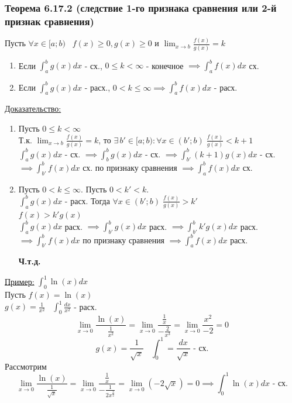 \documentclass[12pt]{article}
\begin{document}
    \subsubsection*{Теорема 6.17.2 (следствие 1-го признака сравнения или 2-й признак сравнения)}\label{th:}
    Пусть $\forall x \in [a;b) \;\;\; f(x)\geq 0,g(x)\geq 0$ и $\lim_{x \to b}\frac{f(x)}{g(x)}=k$
    \begin{enumerate}
        \item Если $\int_{a}^{b}g(x)dx$ - сх., $0\leq k< \infty$ - конечное $\implies \int_{a}^{b}f(x)dx$ сх.
        \item Если $\int_{a}^{b}g(x)dx$ - расх., $0 < k \leq \infty \implies \int_{a}^{b}f(x)dx$ - расх.
    \end{enumerate}
    \underline{Доказательство:}
    \begin{adjustwidth}{1.5em}{1.5em}
        \begin{enumerate}
            \item Пусть $0\leq k < \infty$\\
            Т.к. $\lim_{x \to b} \frac{f(x)}{g(x)} = k$, то $\exists\,b' \in [a;b):\forall x\in (b';b) \; \frac{f(x)}{g(x)}<{k+1}$\\
            $\int_{a}^{b}g(x)dx$ - сх. $\implies \int_{b}^{b}g(x)dx$ - сх. $\implies \int_{b'}^{b}(k+1)g(x)dx$ - сх. $\implies \int_{b'}^{b}f(x)dx$ сх. по признаку сравнения $\implies \int_{a}^{b}f(x)dx$ сх.
            \item Пусть $0<k\leq \infty$. Пусть $0<k'<k$.\\
            $\int_{a}^{b}g(x)dx$ - расх. Тогда $\forall x \in (b';b) \; \frac{f(x)}{g(x)}>k'$\\
            $f(x)>k'g(x)$\\
            $\int_{a}^{b}g(x)dx$ расх. $\implies \int_{b'}^{b} g(x)dx$ расх. $\implies \int_{b'}^{b} k'g(x)dx$ расх. $\implies \int_{b'}^{b}f(x)dx$ по признаку
            сравнения $\implies \int_{a}^{b}f(x)dx$ расх. 
            \begin{center}
                \textbf{Ч.т.д.}
            \end{center}
        \end{enumerate}
    \end{adjustwidth}
    \underline{Пример:} $\int_{0}^{1} \ln(x)dx$\\
    Пусть $f(x)=\ln(x)$\\
    $g(x)=\frac{1}{x^2} \;\;\; \int_{0}^{1}\frac{dx}{x^2}$ - расх.\\
    \[ \lim_{x \to 0}\frac{\ln(x)}{\frac{1}{x^2}}=\lim_{x \to 0}\frac{\frac{1}{x}}{-\frac{2}{x^3}}=\lim_{x \to 0}\frac{x^2}{-2}=0 \]
    \[ g(x)=\frac{1}{\sqrt{x}} \;\;\; \int_{0}^{1}=\frac{dx}{\sqrt{x}} \text{ - сх.}\]
    Рассмотрим 
    \[ \lim_{x \to 0}\frac{\ln(x)}{\frac{1}{\sqrt{x}}}=\lim_{x \to 0}\frac{\frac{1}{x}}{-\frac{1}{2x^{\frac{3}{2}}}}=\lim_{x \to 0}(-2\sqrt{x})=0 \implies \int_{0}^{1}\ln(x)dx \text{ - сх.}\]
\end{document}
